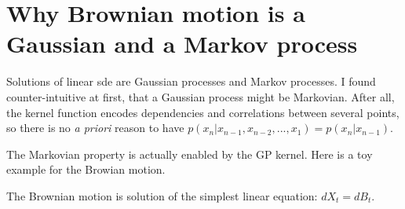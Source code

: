 




\chapter{Why Brownian motion is a Gaussian and a Markov process}\label{sec:brownian_motion_gaussian_and_markov}

Solutions of linear \gls{sde} are Gaussian processes and Markov processes. I found counter-intuitive at first, that a Gaussian process might be Markovian.
After all, the kernel function encodes dependencies and correlations between several points, so there is no \textit{a priori} reason to have 
$p(x_n \vert x_{n-1}, x_{n-2}, ... , x_1) = p(x_n \vert x_{n-1})$.

The Markovian property is actually enabled by the GP kernel. Here is a toy example for the Browian motion.

The Brownian motion is solution of the simplest linear equation: $dX_t = dB_t$.

